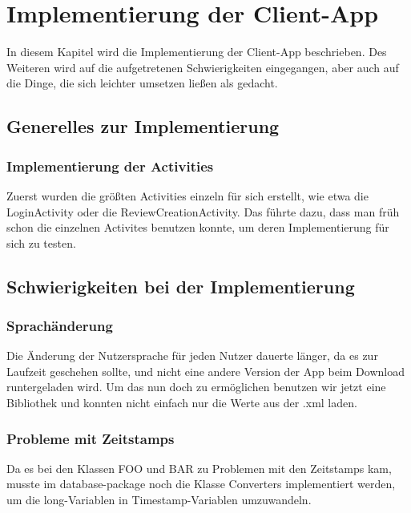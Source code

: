 
\section{Implementierung der Client-App}

    In diesem Kapitel wird die Implementierung der Client-App beschrieben. Des Weiteren wird auf die aufgetretenen Schwierigkeiten eingegangen, aber auch auf die Dinge, die sich leichter umsetzen ließen als gedacht.

    \subsection{Generelles zur Implementierung}

        \subsubsection{Implementierung der Activities}

            Zuerst wurden die größten Activities einzeln für sich erstellt, wie etwa die LoginActivity oder die ReviewCreationActivity. Das führte dazu, dass man früh schon die einzelnen Activites benutzen konnte, um deren Implementierung für sich zu testen.

    \subsection{Schwierigkeiten bei der Implementierung}

        \subsubsection{Sprachänderung}

            Die Änderung der Nutzersprache für jeden Nutzer dauerte länger, da es zur Laufzeit geschehen sollte, und nicht eine andere Version der App beim Download runtergeladen wird.
            Um das nun doch zu ermöglichen benutzen wir jetzt eine Bibliothek und konnten nicht einfach nur die Werte aus der .xml laden.

        \subsubsection{Probleme mit Zeitstamps}

            Da es bei den Klassen FOO und BAR zu Problemen mit den Zeitstamps kam, musste im database-package noch die Klasse Converters implementiert werden, um die long-Variablen in Timestamp-Variablen umzuwandeln.
